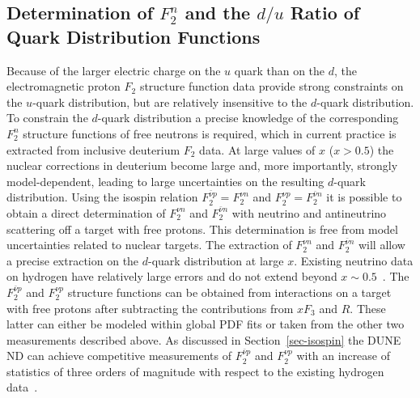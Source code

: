 \subsection{\boldmath Determination of $F_2^n$ and the $d/u$ Ratio of Quark Distribution Functions}
Because of the larger electric charge on the $u$ quark than on the
$d$, the electromagnetic proton $F_2$ structure function data provide
strong constraints on the $u$-quark distribution, but are relatively
insensitive to the $d$-quark distribution.  To constrain the $d$-quark
distribution a precise knowledge of the corresponding $F_2^n$
structure functions of free neutrons is required, which in current practice is
extracted from inclusive deuterium $F_2$ data.  At large values of $x$
($x>0.5$) the nuclear corrections in deuterium become large and, more
importantly, strongly model-dependent, leading to large uncertainties
on the resulting $d$-quark distribution.  Using the isospin relation
$F_2^{\bar \nu p} = F_2^{\nu n}$ and $F_2^{\nu p} = F_2^{\bar \nu n}$
it is possible to obtain a direct determination of $F_2^{\nu n}$ and
$F_2^{\bar \nu n}$ with neutrino and antineutrino scattering off a target with free
protons. This determination is free from model uncertainties
related to nuclear targets. The extraction of $F_2^{\nu n}$ and
$F_2^{\bar \nu n}$ will allow a precise extraction on the $d$-quark
distribution at large $x$.  Existing neutrino data on hydrogen  
have relatively large errors and do not extend beyond
$x\sim0.5$~\cite{Bodek:1985tv,Jones:1987gk}.
The $F_2^{\bar \nu p}$ and $F_2^{\nu p}$ structure functions can be
obtained from interactions on a target with free protons  after subtracting
the contributions from $xF_3$ and $R$. These latter can either be
modeled within global PDF fits or taken from the other two
measurements described above. As discussed in Section~\ref{sec-isospin} the DUNE 
ND can achieve competitive measurements of $F_2^{\bar \nu p}$ and $F_2^{\nu p}$ 
with an increase of statistics of three orders of magnitude with respect to the 
existing hydrogen data~\cite{Bodek:1985tv,Jones:1987gk}. 
